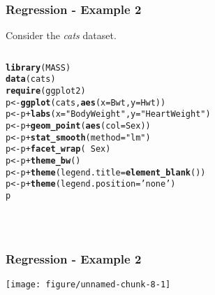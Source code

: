 \documentclass{beamer}\usepackage[]{graphicx}\usepackage[]{color}
\makeatletter
\newcommand{\hlstr}[1]{\textcolor[rgb]{0.192,0.494,0.8}{#1}}%
\newcommand{\hlopt}[1]{\textcolor[rgb]{0,0,0}{#1}}%
\newcommand{\hlstd}[1]{\textcolor[rgb]{0.345,0.345,0.345}{#1}}%
\newcommand{\hlkwb}[1]{\textcolor[rgb]{0.69,0.353,0.396}{#1}}%
\newcommand{\hlkwc}[1]{\textcolor[rgb]{0.333,0.667,0.333}{#1}}%
\newcommand{\hlkwd}[1]{\textcolor[rgb]{0.737,0.353,0.396}{\textbf{#1}}}%
\newenvironment{kframe}{%
 \def\at@end@of@kframe{}%
 \ifinner\ifhmode%
  \def\at@end@of@kframe{\end{minipage}}%
  \begin{minipage}{\columnwidth}%
 \fi\fi%
 \def\FrameCommand##1{\hskip\@totalleftmargin \hskip-\fboxsep
 \colorbox{shadecolor}{##1}\hskip-\fboxsep
     \hskip-\linewidth \hskip-\@totalleftmargin \hskip\columnwidth}%
 \MakeFramed {\advance\hsize-\width
   \@totalleftmargin\z@ \linewidth\hsize
   \@setminipage}}%
 {\par\unskip\endMakeFramed%
 \at@end@of@kframe}
\newenvironment{knitrout}{}{} %
\makeatother
\begin{document}
\begin{frame}[fragile] \frametitle{Regression - Example 2}

\item Consider the \textit{cats} dataset.

\begin{columns}[c]

\begin{knitrout}
\color{fgcolor}\begin{kframe}
\begin{alltt}
\hlkwd{library}\hlstd{(MASS)}
\hlkwd{data}\hlstd{(cats)}
\hlkwd{require}\hlstd{(ggplot2)}
\hlstd{p} \hlkwb{<-}  \hlkwd{ggplot}\hlstd{(cats,} \hlkwd{aes}\hlstd{(}\hlkwc{x} \hlstd{= Bwt,} \hlkwc{y} \hlstd{= Hwt))}
\hlstd{p} \hlkwb{<-} \hlstd{p} \hlopt{+} \hlkwd{labs}\hlstd{(}\hlkwc{x}\hlstd{=}\hlstr{"Body Weight"}\hlstd{,}\hlkwc{y}\hlstd{=}\hlstr{"Heart Weight"}\hlstd{)}
\hlstd{p} \hlkwb{<-} \hlstd{p} \hlopt{+} \hlkwd{geom_point}\hlstd{(}\hlkwd{aes}\hlstd{(}\hlkwc{col}\hlstd{=Sex))}
\hlstd{p} \hlkwb{<-} \hlstd{p} \hlopt{+} \hlkwd{stat_smooth}\hlstd{(}\hlkwc{method} \hlstd{=} \hlstr{"lm"}\hlstd{)}
\hlstd{p} \hlkwb{<-} \hlstd{p} \hlopt{+} \hlkwd{facet_wrap}\hlstd{(}\hlopt{~}\hlstd{Sex)}
\hlstd{p} \hlkwb{<-} \hlstd{p} \hlopt{+} \hlkwd{theme_bw}\hlstd{()}
\hlstd{p} \hlkwb{<-} \hlstd{p} \hlopt{+} \hlkwd{theme}\hlstd{(}\hlkwc{legend.title} \hlstd{=} \hlkwd{element_blank}\hlstd{())}
\hlstd{p} \hlkwb{<-} \hlstd{p} \hlopt{+} \hlkwd{theme}\hlstd{(}\hlkwc{legend.position}\hlstd{=}\hlstr{'none'}\hlstd{)}
\hlstd{p}
\end{alltt}
\end{kframe}
\end{knitrout}

\end{columns}
\ \\
\end{frame}


\begin{frame}[fragile] \frametitle{Regression - Example 2}

\begin{center}

\begin{knitrout}
\color{fgcolor}\begin{kframe}


{\ttfamily\noindent\color{warningcolor}{\#\# Warning: package 'MASS' was built under R version 3.6.3}}

{\ttfamily\noindent\itshape{}}\end{kframe}
\texttt{[image: figure/unnamed-chunk-8-1]} 

\end{knitrout}

\end{center}
\end{frame}
\end{document}
